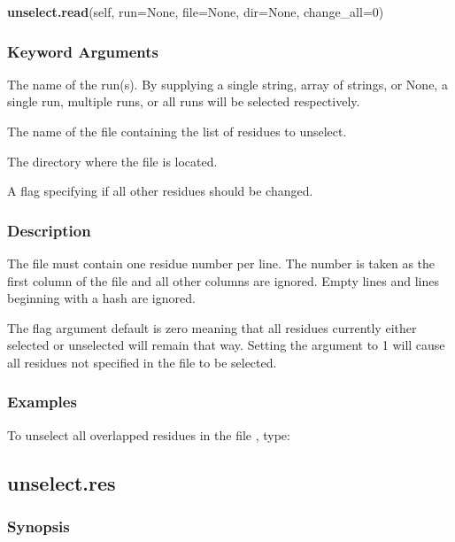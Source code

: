 \textsf{\textbf{unselect.read}(self, run=None, file=None, dir=None, change\_all=0)}


\subsubsection{Keyword Arguments}


  The name of the run(s).  By supplying a single string, array of strings, or None, a single run, multiple runs, or all runs will be selected respectively.

  The name of the file containing the list of residues to unselect.

  The directory where the file is located.

  A flag specifying if all other residues should be changed.

\subsubsection{Description}

The file must contain one residue number per line.  The number is taken as the first column
of the file and all other columns are ignored.  Empty lines and lines beginning with a hash
are ignored.

The 
 flag argument default is zero meaning that all residues currently either
selected or unselected will remain that way.  Setting the argument to 1 will cause all
residues not specified in the file to be selected.


\subsubsection{Examples}

To unselect all overlapped residues in the file 
, type:





\newpage

\subsection{unselect.res}


\subsubsection{Synopsis}

